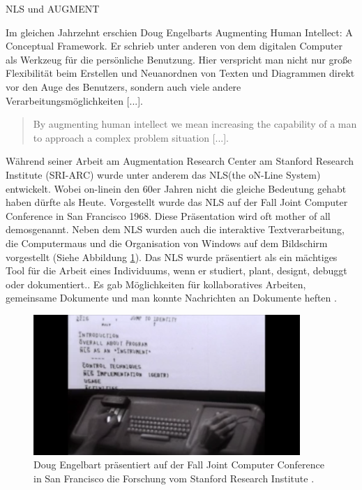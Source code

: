 \begin{section}{NLS und AUGMENT}
\label{sec:nls}

Im gleichen Jahrzehnt erschien Doug Engelbarts \glqq Augmenting Human Intellect: A Conceptual Framework\grqq{ }. Er schrieb unter anderen von dem \glqq digitalen Computer als Werkzeug für die persönliche Benutzung. Hier verspricht man nicht nur große Flexibilität beim Erstellen und Neuanordnen von Texten und Diagrammen direkt vor den Auge des Benutzers, sondern auch viele andere Verarbeitungsmöglichkeiten [...]\grqq{ }\cite[S. 17]{Engelbart1962}.

\begin{quote}
\glqq By augmenting human intellect we mean increasing the capability of a man to approach a complex problem situation [...].\grqq{ }\cite[S. 1]{Engelbart1962}
\end{quote}

Während seiner Arbeit am Augmentation Research Center am Stanford Research Institute (SRI-ARC) wurde unter anderem das \glqq NLS\grqq{ }(the oN-Line System) entwickelt. Wobei \glqq on-line\grqq{ }in den 60er Jahren nicht die gleiche Bedeutung gehabt haben dürfte als Heute. Vorgestellt wurde das NLS auf der Fall Joint Computer Conference in San Francisco 1968. Diese Präsentation wird oft \glqq mother of all demos\grqq{ }genannt. Neben dem NLS wurden auch die interaktive Textverarbeitung, die Computermaus und die Organisation von Windows auf dem Bildschirm vorgestellt (Siehe Abbildung \ref{fig:mother}). Das NLS wurde präsentiert als \glqq ein mächtiges Tool für die Arbeit eines Individuums, wenn er studiert, plant, designt, debuggt oder dokumentiert.\grqq{ }\cite{MotherOfDemo1968}. Es gab Möglichkeiten für kollaboratives Arbeiten, gemeinsame Dokumente und man konnte Nachrichten an Dokumente heften \cite{MotherOfDemo1968}. 

\begin{figure}[!ht]
	\centering
	\includegraphics[width=0.9\textwidth]{image/mother}
	\caption{Doug Engelbart präsentiert auf der Fall Joint Computer Conference in San Francisco die Forschung vom Stanford Research Institute \cite{MotherOfDemo1968}.}
	\label{fig:mother}
\end{figure}


\end{section}
